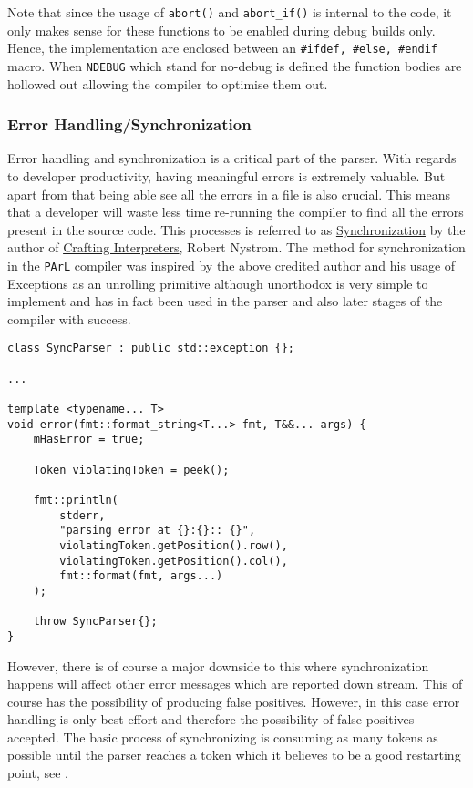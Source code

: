Note that since the usage of \texttt{abort()} and
\texttt{abort\_if()} is internal to the code, it only makes
sense for these functions to be enabled during debug builds
only. Hence, the implementation are enclosed between an
\texttt{\#ifdef, \#else, \#endif} macro. When \texttt{NDEBUG}
which stand for no-debug is defined the function bodies are
hollowed out allowing the \CC{} compiler to optimise them out.

\subsubsection{Error Handling/Synchronization}

Error handling and synchronization is a critical part of the
parser. With regards to developer productivity, having
meaningful errors is extremely valuable. But apart from that
being able see all the errors in a file is also crucial. This
means that a developer will waste less time re-running the
compiler to find all the errors present in the source code. This
processes is referred to as
\href{https://craftinginterpreters.com/parsing-expressions.html#synchronizing-a-recursive-descent-parser}{Synchronization}
by the author of
\href{https://craftinginterpreters.com/}{Crafting Interpreters},
Robert Nystrom. The method for synchronization in the
\texttt{PArL} compiler was inspired by the above credited author
and his usage of Exceptions as an unrolling primitive although
unorthodox is very simple to implement and has in fact been used
in the parser and also later stages of the compiler with success.

\begin{lstlisting}[caption={The \texttt{ParseSync} exception and
the \texttt{error()} method which kickstarts the synchronization
process (parser/Parser.hpp)}, label=lst:synckickstart]
class SyncParser : public std::exception {};

...

template <typename... T>
void error(fmt::format_string<T...> fmt, T&&... args) {
    mHasError = true;

    Token violatingToken = peek();

    fmt::println(
        stderr,
        "parsing error at {}:{}:: {}",
        violatingToken.getPosition().row(),
        violatingToken.getPosition().col(),
        fmt::format(fmt, args...)
    );

    throw SyncParser{};
}
\end{lstlisting}

However, there is of course a major downside to this where
synchronization happens will affect other error messages which
are reported down stream. This of course has the possibility of
producing false positives. However, in this case error handling
is only best-effort and therefore the possibility of false
positives accepted. The basic process of synchronizing is
consuming as many tokens as possible until the parser reaches a
token which it believes to be a good restarting point, see
.

